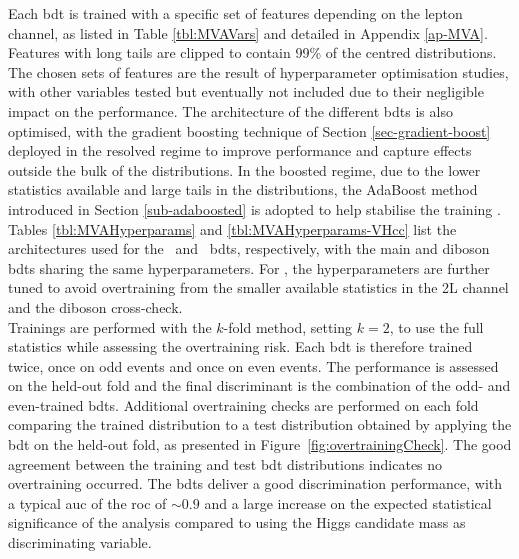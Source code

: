 Each \gls{bdt} is trained with a specific set of features depending on the lepton channel, as listed in Table \ref{tbl:MVAVars} and detailed in Appendix \ref{ap-MVA}. Features with long tails are clipped to contain 99\% of the centred distributions. The chosen sets of features are the result of hyperparameter optimisation studies, with other variables tested but eventually not included due to their negligible impact on the performance. The architecture of the different \glspl{bdt} is also optimised, with the gradient boosting technique of Section \ref{sec-gradient-boost} deployed in the resolved regime to improve performance and capture effects outside the bulk of the distributions. In the boosted regime, due to the lower statistics available and large tails in the distributions, the AdaBoost method introduced in Section \ref{sub-adaboosted} is adopted to help stabilise the training \cite{Adaboost}. Tables \ref{tbl:MVAHyperparams} and \ref{tbl:MVAHyperparams-VHcc} list the architectures used for the \vhb\ and \vhc\ \glspl{bdt}, respectively, with the main and diboson \glspl{bdt} sharing the same hyperparameters. For \vhc, the hyperparameters are further tuned to avoid overtraining from the smaller available statistics in the 2L channel and the diboson cross-check. \\

Trainings are performed with the $k$-fold method, setting $k = 2$, to use the full statistics while assessing the overtraining risk. Each \gls{bdt} is therefore trained twice, once on odd events and once on even events. The performance is assessed on the held-out fold and the final discriminant is the combination of the odd- and even-trained \glspl{bdt}. Additional overtraining checks are performed on each fold comparing the trained distribution to a test distribution obtained by applying the \gls{bdt} on the held-out fold, as presented in Figure~\ref{fig:overtrainingCheck}. The good agreement between the training and test \gls{bdt} distributions indicates no overtraining occurred. The \glspl{bdt} deliver a good discrimination performance, with a typical \gls{auc} of the \gls{roc} of $\sim 0.9$ and a large increase on the expected statistical significance of the analysis compared to using the Higgs candidate mass as discriminating variable. \\

\newpage
\vspace*{\fill}

\vspace*{\fill}
\newpage
\vspace*{\fill}


